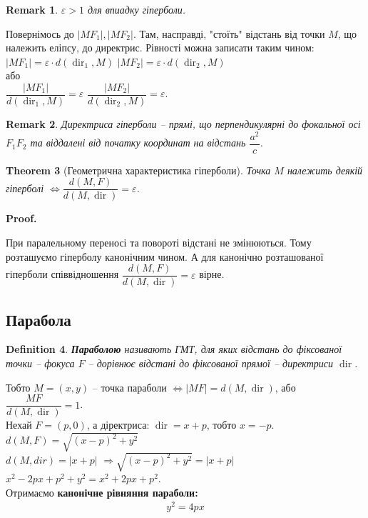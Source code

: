 \documentclass[a4paper, 10pt]{extarticle}
\makeatletter
\def\qed{$\blacksquare$}
\def\qed{$\blacksquare$}
\theoremstyle{theoremdd}
\newtheorem{theorem}{Theorem}[subsection]
\theoremstyle{theoremdd}
\newtheorem{definition}[theorem]{Definition}
\theoremstyle{theoremdd}
\theoremstyle{theoremdd}
\theoremstyle{theoremdd}
\theoremstyle{theoremdd}
\newtheorem{remark}[theorem]{Remark}
\theoremstyle{theoremdd}
\theoremstyle{theoremdd}
\renewenvironment{proof}[1][Proof.\\]{\par
\pushQED{\hfill \qed}%
\normalfont \topsep6\p@\@plus6\p@\relax
\trivlist
\item\relax
{\bfseries
#1\@addpunct{.}}\hspace\labelsep\ignorespaces
}{%
\popQED\endtrivlist\@endpefalse
}
\DeclareMathOperator{\dir}{dir}
\makeatother
\begin{document}
\begin{remark}
$\varepsilon > 1$ для впиадку гіперболи.
\end{remark}

Повернімось до $|MF_1|,|MF_2|$. Там, насправді, "стоїть" \textrm{} відстань від точки $M$, що належить еліпсу, до директрис. Рівності можна записати таким чином:\\
$|MF_1| = \varepsilon \cdot d(\dir_1, M)$ \qquad $|MF_2| = \varepsilon \cdot d(\dir_2, M)$\\
або\\
$\dfrac{|MF_1|}{d(\dir_1, M)} = \varepsilon$ \qquad $\dfrac{|MF_2|}{d(\dir_2, M)} = \varepsilon$.

\begin{remark}
Директриса гіперболи -- прямі, що перпендикулярні до фокальної осі $F_1F_2$ та віддалені від початку координат на відстань $\dfrac{a^2}{c}$.
\end{remark}

\begin{theorem}[Геометрична характеристика гіперболи]
Точка $M$ належить деякій гіперболі $\iff \dfrac{d(M,F)}{d(M,\dir)} = \varepsilon$.
\end{theorem}

\begin{proof}
При паралельному переносі та повороті відстані не змінюються. Тому розташуємо гіперболу канонічним чином. А для канонічно розташованої гіперболи співвідношення $\dfrac{d(M,F)}{d(M,\dir)} = \varepsilon$ вірне.
\end{proof}

\subsection{Парабола}
\begin{definition}
\textbf{Параболою} називають ГМТ, для яких відстань до фіксованої точки -- фокуса $F$ -- дорівнює відстані до фіксованої прямої -- директриси $\dir$.
\end{definition}

Тобто $M=(x,y)$ -- точка параболи $\iff |MF|=d(M,\dir)$, або $\dfrac{MF}{d(M,\dir)}=1$.
\bigskip \\
Нехай $F = (p,0)$, а діректриса: $\dir = x + p$, тобто $x = -p$.\\
$d(M,F)=\sqrt{(x-p)^2+y^2}$\\
$d(M,dir)=|x+p|$
$\Rightarrow \sqrt{(x-p)^2+y^2}=|x+p|$\\
$x^2-2px+p^2+y^2=x^2+2px+p^2$.\\
Отримаємо \textbf{канонічне рівняння параболи:}
\begin{align*}
y^2 = 4px
\end{align*}
\end{document}
